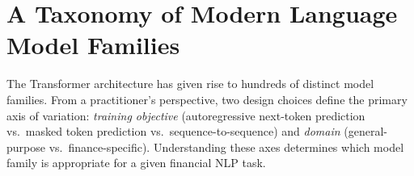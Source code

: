 \section{A Taxonomy of Modern Language Model Families}
\label{sec:llm-families}

\begin{context}
The Transformer architecture has given rise to hundreds of distinct model
families.  From a practitioner's perspective, two design choices define the
primary axis of variation: \emph{training objective} (autoregressive
next-token prediction vs.\ masked token prediction vs.\ sequence-to-sequence)
and \emph{domain} (general-purpose vs.\ finance-specific).  Understanding
these axes determines which model family is appropriate for a given
financial NLP task.
\end{context}


